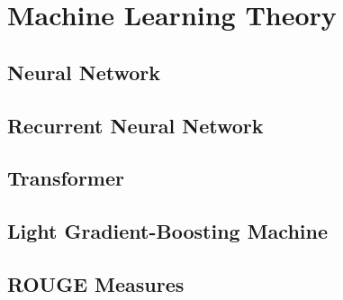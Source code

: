 \chapter{Machine Learning Theory}

%

\section{Neural Network}


\section{Recurrent Neural Network}


\section{Transformer}


\section{Light Gradient-Boosting Machine}


\section{ROUGE Measures}
